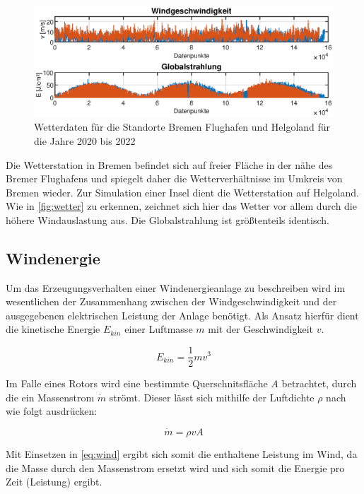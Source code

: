 \begin{figure}[H]
	\centering
	\includegraphics[width=\linewidth]{Abbildungen/Wetter20bis22.eps}
	\caption{Wetterdaten für die Standorte Bremen Flughafen und Helgoland für die Jahre 2020 bis 2022}
	\label{fig:wetter}
\end{figure}

Die Wetterstation in Bremen befindet sich auf freier Fläche in der nähe des Bremer Flughafens und spiegelt daher die Wetterverhältnisse im Umkreis von Bremen wieder. Zur Simulation einer Insel dient die Wetterstation auf Helgoland. Wie in \autoref{fig:wetter} zu erkennen, zeichnet sich hier das Wetter vor allem durch die höhere Windauslastung aus. Die Globalstrahlung ist größtenteils identisch.

\subsection{Windenergie}

Um das Erzeugungsverhalten einer Windenergieanlage zu beschreiben wird im wesentlichen der Zusammenhang zwischen der Windgeschwindigkeit und der ausgegebenen elektrischen Leistung der Anlage benötigt. Als Ansatz hierfür dient die kinetische Energie $E_{kin}$ einer Luftmasse $m$ mit der Geschwindigkeit $v$. \cite{Hau2016}

\begin{equation}
	E_{kin} = \frac{1}{2} mv^3
	\label{eq:wind}
\end{equation}

Im Falle eines Rotors wird eine bestimmte Querschnitsfläche $A$ betrachtet, durch die ein Massenstrom $\dot{m}$ strömt. Dieser lässt sich mithilfe der Luftdichte $\rho$ nach \cite{Hau2016} wie folgt ausdrücken:

\begin{equation}
	\dot{m} = \rho vA
\end{equation}

Mit Einsetzen in \autoref{eq:wind} ergibt sich somit die enthaltene Leistung im Wind, da die Masse durch den Massenstrom ersetzt wird und sich somit die Energie pro Zeit (Leistung) ergibt.

